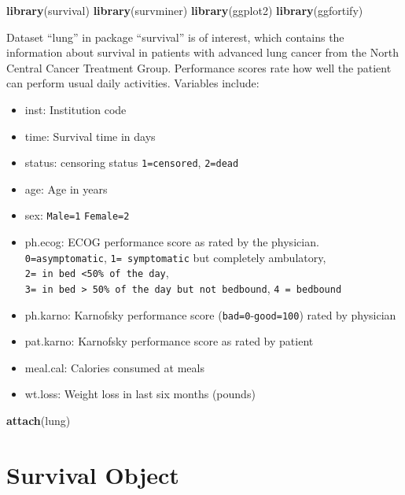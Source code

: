 \documentclass[
]{ctexart}
\newenvironment{Shaded}{\begin{snugshade}}{\end{snugshade}}
\newcommand{\FunctionTok}[1]{\textcolor[rgb]{0.13,0.29,0.53}{\textbf{#1}}}
\newcommand{\NormalTok}[1]{#1}
\providecommand{\tightlist}{%
  \setlength{\itemsep}{0pt}\setlength{\parskip}{0pt}}
\begin{document}
\begin{Shaded}
\begin{Highlighting}[]
\FunctionTok{library}\NormalTok{(survival)}
\FunctionTok{library}\NormalTok{(survminer)}
\FunctionTok{library}\NormalTok{(ggplot2)}
\FunctionTok{library}\NormalTok{(ggfortify)}
\end{Highlighting}
\end{Shaded}

Dataset ``lung'' in package ``survival'' is of interest, which contains
the information about survival in patients with advanced lung cancer
from the North Central Cancer Treatment Group. Performance scores rate
how well the patient can perform usual daily activities. Variables
include:

\begin{itemize}
\tightlist
\item
  inst: Institution code
\item
  time: Survival time in days
\item
  status: censoring status \texttt{1=censored}, \texttt{2=dead}
\item
  age: Age in years
\item
  sex: \texttt{Male=1} \texttt{Female=2}
\item
  ph.ecog: ECOG performance score as rated by the physician.
  \texttt{0=asymptomatic}, \texttt{1=\ symptomatic} but completely
  ambulatory, \texttt{2=\ in\ bed\ \textless{}50\%\ of\ the\ day},
  \texttt{3=\ in\ bed\ \textgreater{}\ 50\%\ of\ the\ day\ but\ not\ bedbound},
  \texttt{4\ =\ bedbound}
\item
  ph.karno: Karnofsky performance score
  (\texttt{bad=0}-\texttt{good=100}) rated by physician
\item
  pat.karno: Karnofsky performance score as rated by patient
\item
  meal.cal: Calories consumed at meals
\item
  wt.loss: Weight loss in last six months (pounds)
\end{itemize}

\begin{Shaded}
\begin{Highlighting}[]
\FunctionTok{attach}\NormalTok{(lung)}
\end{Highlighting}
\end{Shaded}

\hypertarget{survival-object}{%
\section{Survival Object}\label{survival-object}}
\end{document}
